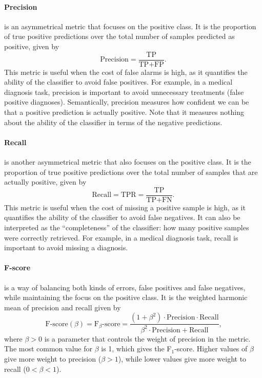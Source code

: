 \paragraph{Precision} is an asymmetrical metric that focuses on the positive class.  It is
the proportion of true positive predictions over the total number of samples predicted as
positive, given by
\begin{equation*}
  \text{Precision} = \frac{\text{TP}}{\text{TP} + \text{FP}}\text{.}
\end{equation*}
This metric is useful when the cost of false alarms is high, as it quantifies the
ability of the classifier to avoid false positives.  For example, in a medical diagnosis
task, precision is important to avoid unnecessary treatments (false positive diagnoses).
Semantically, precision measures how confident we can be that a positive prediction is
actually positive.  Note that it measures nothing about the ability of the classifier in
terms of the negative predictions.

\paragraph{Recall} is another asymmetrical metric that also focuses on the positive class.
It is the proportion of true positive predictions over the total number of
samples that are actually positive, given by
\begin{equation*}
  \text{Recall} = \text{TPR} = \frac{\text{TP}}{\text{TP} + \text{FN}}\text{.}
\end{equation*}
This metric is useful when the cost of missing a positive sample is high, as it quantifies the
ability of the classifier to avoid false negatives.  It can also be interpreted as the
``completeness'' of the classifier: how many positive samples were correctly retrieved.
For example, in a medical diagnosis task, recall is important to avoid missing a
diagnosis.

\paragraph{F-score} is a way of balancing both kinds of errors, false positives and false
negatives, while maintaining the focus on the positive class. It is the weighted harmonic
mean of precision and recall given by
\begin{equation*}
  \text{F-score}(\beta) = \text{F}_\beta\text{-score} =
    \frac%
      {(1 + \beta^2) \cdot \text{Precision} \cdot \text{Recall}}
      {\beta^2 \cdot \text{Precision} + \text{Recall}}\text{,}
\end{equation*}
where $\beta > 0$ is a parameter that controls the weight of precision in the metric.
The most common value for $\beta$ is 1, which gives the F$_1$-score.  Higher values of
$\beta$ give more weight to precision ($\beta > 1$), while lower values give more weight
to recall ($0 < \beta < 1$).

